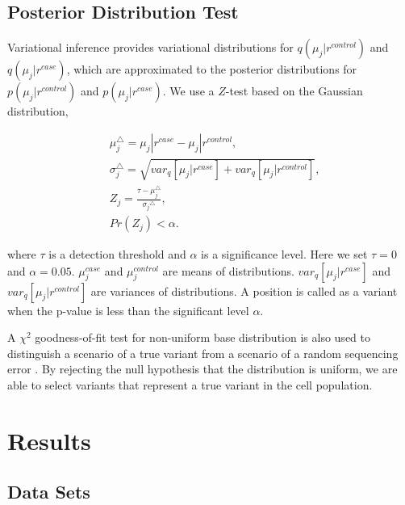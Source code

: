 \documentclass[11pt,reqno]{amsart}
\begin{document}
\subsection{Posterior Distribution Test}
Variational inference provides variational distributions for $q(\mu_j|r^{control})$ and $q(\mu_j|r^{case})$, which are approximated to the posterior distributions for $p(\mu_j|r^{control})$ and $p(\mu_j|r^{case})$.
We use a $Z$-test based on the Gaussian distribution,

\begin{align}
\label{eq:test}
& \mu_j^{\triangle} = \mu_j|r^{case}-\mu_j|r^{control},\\
& \sigma_j^{\triangle} = \sqrt {var_q{[\mu_j|r^{case}]} + var_q{[\mu_j|r^{control}]}},\\
& Z_j = \frac{\tau - \mu_j^{\triangle}}{{\sigma_j}^{\triangle}},\\
& Pr(Z_j) < \alpha.
\end{align}

where $\tau$ is a detection threshold and $\alpha$ is a significance level. Here we set $\tau = 0$ and $\alpha = 0.05$.
$\mu_j^{case}$ and $\mu_j^{control}$ are means of distributions.
$var_q{[\mu_j|r^{case}]}$ and  $var_q{[\mu_j|r^{control}]}$ are variances of distributions.
A position is called as a variant when the p-value is less than the significant level $\alpha$.

A $\chi^2$ goodness-of-fit test for non-uniform base distribution is also used to distinguish a scenario of a true variant from a scenario of a random sequencing error \citep{efron2010large, he2015rvd2}.
By rejecting the null hypothesis that the distribution is uniform, we are able to select variants that represent a true variant in the cell population.

\section{Results}
\subsection{Data Sets}
\end{document}
